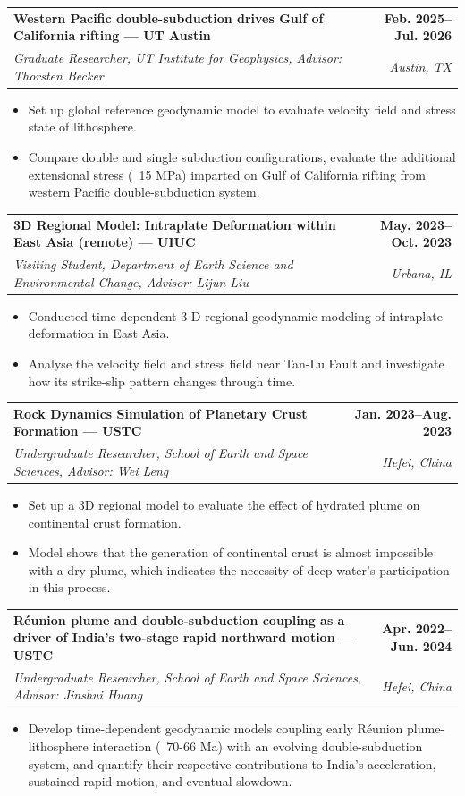 \documentclass[10pt,letterpaper]{article}
\makeatletter
\newcommand{\cventry}[4]{%
  \begin{tabularx}{\textwidth}{@{}Xr@{}}
    \textbf{#1} & \textbf{#2} \\
    \textit{#3} & \textit{#4}
  \end{tabularx}\vspace{0.15em}
}
\makeatother
\begin{document}
\cventry{Western Pacific double-subduction drives Gulf of California rifting — UT Austin}{Feb. 2025--Jul. 2026}
{Graduate Researcher, UT Institute for Geophysics, Advisor: Thorsten Becker}{Austin, TX}
\begin{itemize}
\item Set up global reference geodynamic model to evaluate velocity field and stress state of lithosphere.
\item Compare double and single subduction configurations, evaluate the additional extensional stress (~15 MPa) imparted on Gulf of California rifting from western Pacific double-subduction system.
\end{itemize}

\cventry{3D Regional Model: Intraplate Deformation within East Asia (remote) — UIUC}{May. 2023--Oct. 2023}
{Visiting Student, Department of Earth Science and Environmental Change, Advisor: Lijun Liu}{Urbana, IL}
\begin{itemize}
  \item Conducted time-dependent 3-D regional geodynamic modeling of intraplate deformation in East Asia.
  \item Analyse the velocity field and stress field near Tan-Lu Fault and investigate how its strike-slip pattern changes through time.
\end{itemize}

\cventry{Rock Dynamics Simulation of Planetary Crust Formation — USTC}{Jan. 2023--Aug. 2023}
{Undergraduate Researcher, School of Earth and Space Sciences, Advisor: Wei Leng}{Hefei, China}
\begin{itemize}
  \item Set up a 3D regional model to evaluate the effect of hydrated plume on continental crust formation.
  \item Model shows that the generation of continental crust is almost impossible with a dry plume, which indicates the necessity of deep water's participation in this process. 
\end{itemize}

\cventry{Réunion plume and double-subduction coupling as a driver of India's two-stage rapid northward motion — USTC}{Apr. 2022--Jun. 2024}
{Undergraduate Researcher, School of Earth and Space Sciences, Advisor: Jinshui Huang}{Hefei, China}
\begin{itemize}
  \item Develop time-dependent geodynamic models coupling early Réunion plume-lithosphere interaction (~70-66 Ma) with an evolving double-subduction system, and quantify their respective contributions to India's acceleration, sustained rapid motion, and eventual slowdown.
\end{itemize}
\end{document}
